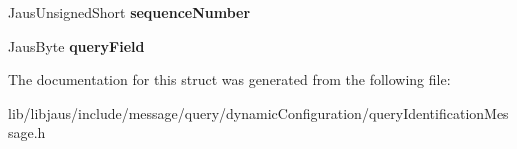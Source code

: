 \begin{DoxyCompactItemize}
\item 
\hypertarget{struct_query_identification_message_struct_a55216fdcd904d9bb05628c3534661f66}{\-Jaus\-Unsigned\-Short {\bfseries sequence\-Number}}\label{struct_query_identification_message_struct_a55216fdcd904d9bb05628c3534661f66}

\item 
\hypertarget{struct_query_identification_message_struct_aa0fd47a982e13405b9fb767e9ff6ec43}{\-Jaus\-Byte {\bfseries query\-Field}}\label{struct_query_identification_message_struct_aa0fd47a982e13405b9fb767e9ff6ec43}

\end{DoxyCompactItemize}


\-The documentation for this struct was generated from the following file\-:\begin{DoxyCompactItemize}
\item 
lib/libjaus/include/message/query/dynamic\-Configuration/query\-Identification\-Message.\-h\end{DoxyCompactItemize}
